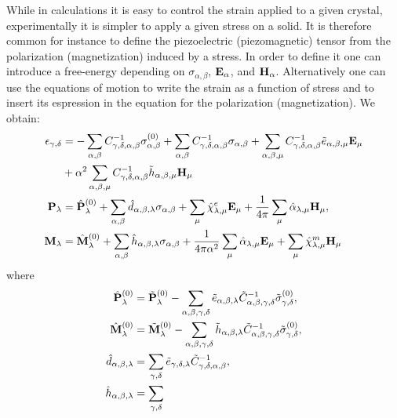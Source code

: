 \documentclass[12pt,a4paper]{article}
\begin{document}
\newpage
{\color{web-blue}
While in calculations it is easy to control the strain applied to
a given crystal, experimentally it is simpler to apply a given stress
on a solid. It is therefore common for instance to define the 
piezoelectric (piezomagnetic) tensor from the polarization 
(magnetization) induced by a stress. In order to define it one 
can introduce a free-energy depending on $\sigma_{\alpha,\beta}$,
${\bf E}_\alpha$, and ${\bf H}_\alpha$. Alternatively one can use the
equations of motion to write the strain as a function of stress and
to insert its espression in the equation for the polarization
(magnetization). We obtain:
\begin{align}
\epsilon_{\gamma,\delta} &=
- \sum_{\alpha,\beta} 
C^{-1}_{\gamma,\delta,\alpha,\beta} \sigma^{(0)}_{\alpha,\beta} 
+ \sum_{\alpha,\beta} 
C^{-1}_{\gamma,\delta,\alpha,\beta} \sigma_{\alpha,\beta} 
+ \sum_{\alpha,\beta,\mu} 
C^{-1}_{\gamma,\delta,\alpha,\beta} \tilde e_{\alpha,\beta,\mu} {\bf E}_\mu 
\nonumber \\
&+ \alpha^2 \sum_{\alpha,\beta,\mu} 
C^{-1}_{\gamma,\delta,\alpha,\beta} \tilde h_{\alpha,\beta,\mu} {\bf H}_\mu 
\\
{\bf P}_{\lambda}&= \hat {\bf P}^{(0)}_{\lambda}
+\sum_{\alpha,\beta} \hat d_{\alpha,\beta,\lambda} 
\sigma_{\alpha,\beta} +
\sum_{\mu} 
\hat \chi^e_{\lambda,\mu}
{\bf E}_{\mu} +
{1\over 4 \pi} \sum_{\mu} \hat \alpha_{\lambda,\mu} 
{\bf H}_{\mu}, \\
{\bf M}_{\lambda}&= \hat {\bf M}^{(0)}_{\lambda}
+\sum_{\alpha,\beta} \hat h_{\alpha,\beta,\lambda} 
\sigma_{\alpha,\beta} +
{1\over 4 \pi \alpha^2} \sum_{\mu} \hat \alpha_{\lambda,\mu} 
{\bf E}_{\mu}+
\sum_{\mu} 
\hat \chi^m_{\lambda,\mu}
{\bf H}_{\mu}
\end{align} 
where
\begin{align}
\hat {\bf P}^{(0)}_{\lambda}&= \tilde {\bf P}^{(0)}_{\lambda}
-\sum_{\alpha,\beta,\gamma,\delta} \tilde e_{\alpha,\beta,\lambda}
\tilde C^{-1}_{\alpha,\beta,\gamma,\delta} 
\tilde \sigma^{(0)}_{\gamma,\delta}, \\
\hat {\bf M}^{(0)}_{\lambda}&= \tilde {\bf M}^{(0)}_{\lambda}
-\sum_{\alpha,\beta,\gamma,\delta} \tilde h_{\alpha,\beta,\lambda}
\tilde C^{-1}_{\alpha,\beta,\gamma,\delta} 
\tilde \sigma^{(0)}_{\gamma,\delta}, \\
\hat d_{\alpha,\beta,\lambda}&= \sum_{\gamma,\delta} 
\tilde e_{\gamma,\delta,\lambda} 
\tilde C^{-1}_{\gamma,\delta,\alpha,\beta}, \\
\hat h_{\alpha,\beta,\lambda}&= \sum_{\gamma,\delta} 

\end{align}}
\end{document}
